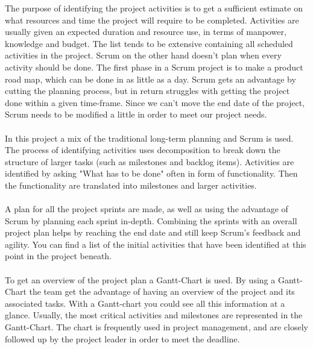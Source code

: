 The purpose of identifying the project activities is to get a sufficient estimate on what resources and time the project will require to be completed. Activities are usually given an expected duration and resource use, in terms of manpower, knowledge and budget. 
The list tends to be extensive containing all scheduled activities in the project. Scrum on the other hand doesn't plan when every activity should be done. The first phase in a Scrum project is to make a product road map, which can be done in as little as a day. Scrum gets an advantage by cutting the planning process, but in return struggles with getting the project done within a given time-frame. Since we can't move the end date of the project, Scrum needs to be modified a little in order to meet our project needs. 
\\\\
In this project a mix of the traditional long-term planning and Scrum is used. The process of identifying activities uses decomposition to break down the structure of larger tasks (such as milestones and backlog items). Activities are identified by asking "What has to be done" often in form of functionality. Then the functionality are translated into milestones and larger activities.
\\\\
A plan for all the project sprints are made, as well as using the advantage of Scrum by planning each sprint in-depth. Combining the sprints with an overall project plan helps by reaching the end date and still keep Scrum's feedback and agility. You can find a list of the initial activities that have been identified at this point in the project beneath. 
\\\\
To get an overview of the project plan a Gantt-Chart is used. By using a Gantt-Chart the team get the advantage of having an overview of the project and its associated tasks. With a Gantt-chart you could see all this information at a glance. Usually, the most critical activities and milestones are represented in the Gantt-Chart. The chart is frequently used in project management, and are closely followed up by the project leader in order to meet the deadline.
\\\\

